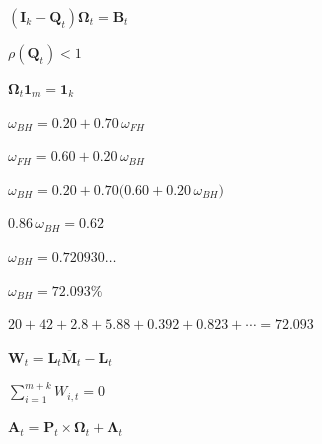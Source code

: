 \documentclass[12pt]{article}
\newenvironment{slidemath}
  {\begin{preview}\color{mssnavy}\(\displaystyle}
  {\)\end{preview}}
\begin{document}
\begin{slidemath}
(\mathbf I_k-\mathbf Q_t)\boldsymbol\Omega_t=\mathbf B_t
\end{slidemath}

\begin{slidemath}
\rho(\mathbf Q_t)<1
\end{slidemath}

\begin{slidemath}
\boldsymbol\Omega_t\mathbf 1_m=\mathbf 1_k
\end{slidemath}

\begin{slidemath}
\omega_{BH}=0.20+0.70\,\omega_{FH}
\end{slidemath}

\begin{slidemath}
\omega_{FH}=0.60+0.20\,\omega_{BH}
\end{slidemath}

\begin{slidemath}
\omega_{BH}=0.20+0.70\bigl(0.60+0.20\,\omega_{BH}\bigr)
\end{slidemath}

\begin{slidemath}
0.86\,\omega_{BH}=0.62
\end{slidemath}

\begin{slidemath}
\omega_{BH}=0.720930\ldots
\end{slidemath}

\begin{slidemath}
\omega_{BH}=72.093\%
\end{slidemath}

\begin{slidemath}
20+42+2.8+5.88+0.392+0.823+\cdots=72.093
\end{slidemath}

\begin{slidemath}
\mathbf W_t=\mathbf L_t\overline{\mathbf M}_t-\mathbf L_t
\end{slidemath}

\begin{slidemath}
\sum_{i=1}^{m+k}W_{i,t}=0
\end{slidemath}

\begin{slidemath}
\mathbf A_t=\mathbf P_t\times\boldsymbol\Omega_t+\boldsymbol\Lambda_t
\end{slidemath}
\end{document}
